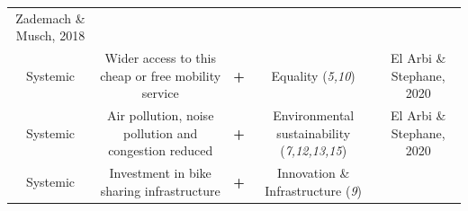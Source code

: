 \documentclass[
]{book}
\begin{document}
\begin{longtable}[]{@{}ccccc@{}}
\begin{minipage}[t]{0.17\columnwidth}
Zademach \& Musch, 2018\strut
\end{minipage}\tabularnewline
\begin{minipage}[t]{0.17\columnwidth}\centering
Systemic\strut
\end{minipage} & \begin{minipage}[t]{0.16\columnwidth}\centering
Wider access to this cheap or free mobility service\strut
\end{minipage} & \begin{minipage}[t]{0.17\columnwidth}\centering
\textbf{+}\strut
\end{minipage} & \begin{minipage}[t]{0.17\columnwidth}\centering
Equality (\emph{5,10})\strut
\end{minipage} & \begin{minipage}[t]{0.17\columnwidth}\centering
El Arbi \& Stephane, 2020\strut
\end{minipage}\tabularnewline
\begin{minipage}[t]{0.17\columnwidth}\centering
Systemic\strut
\end{minipage} & \begin{minipage}[t]{0.16\columnwidth}\centering
Air pollution, noise pollution and congestion reduced\strut
\end{minipage} & \begin{minipage}[t]{0.17\columnwidth}\centering
\textbf{+}\strut
\end{minipage} & \begin{minipage}[t]{0.17\columnwidth}\centering
Environmental sustainability (\emph{7,12,13,15})\strut
\end{minipage} & \begin{minipage}[t]{0.17\columnwidth}\centering
El Arbi \& Stephane, 2020\strut
\end{minipage}\tabularnewline
\begin{minipage}[t]{0.17\columnwidth}\centering
Systemic\strut
\end{minipage} & \begin{minipage}[t]{0.16\columnwidth}\centering
Investment in bike sharing infrastructure\strut
\end{minipage} & \begin{minipage}[t]{0.17\columnwidth}\centering
\textbf{+}\strut
\end{minipage} & \begin{minipage}[t]{0.17\columnwidth}\centering
Innovation \& Infrastructure (\emph{9})\strut
\end{minipage} & \begin{minipage}[t]{0.17\columnwidth}\centering

\end{minipage}
\end{longtable}
\end{document}
